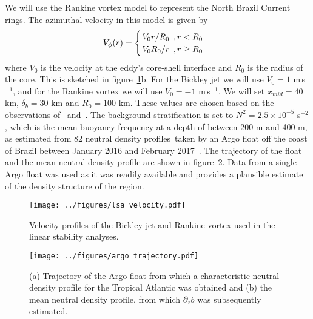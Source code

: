 We will use the Rankine vortex model to represent the North Brazil Current rings. The azimuthal velocity in this model is given by
\begin{equation}
    V_{\phi}(r) = 
    \begin{cases}
        \flatfrac{V_0 r}{R_0} \, , r < R_0 \\
        \flatfrac{V_0 R_0}{r} \, , r \geq R_0
    \end{cases}
\end{equation}
where $V_0$ is the velocity at the eddy's core-shell interface and $R_0$ is the radius of the core. This is sketched in figure~\ref{fig:InitialVelocity}b. For the Bickley jet we will use $V_0 = 1$ m$\,$s$^{-1}$, and for the Rankine vortex we will use $V_0 = - 1$ m$\,$s$^{-1}$. We will set $x_{mid} = 40$ km, $\delta_b = 30$ km and $R_0 = 100$ km. These values are chosen based on the observations of~\citet{Johns1998} and~\citet{Castelao2011}. The background stratification is set to $N^2 = 2.5 \times 10^{-5}$ s$^{-2}$, which is the mean buoyancy frequency at a depth of between 200 m and 400 m, as estimated from 82 neutral density profiles\footnotemark\ taken by an Argo float off the coast of Brazil between January 2016 and February 2017~\citep{Argo2022}.
The trajectory of the float and the mean neutral density profile are shown in figure~\ref{fig:InitialStratification}. Data from a single Argo float was used as it was readily available and provides a plausible estimate of the density structure of the region.

\begin{figure}[t]
    \centering
    \texttt{[image: ../figures/lsa\_velocity.pdf]}
    \caption{Velocity profiles of the Bickley jet and Rankine vortex used in the linear stability analyses.}
    \label{fig:InitialVelocity}
\end{figure}

\begin{figure}[t]
    \centering
    \texttt{[image: ../figures/argo\_trajectory.pdf]}
    \caption{(a) Trajectory of the Argo float from which a characteristic neutral density profile for the Tropical Atlantic was obtained and (b) the mean neutral density profile, from which $\partial_z b$ was subsequently estimated.}
    \label{fig:InitialStratification}
\end{figure}

